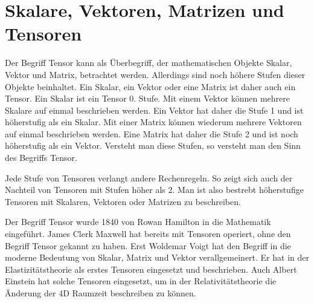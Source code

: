 \section{Skalare, Vektoren, Matrizen und Tensoren\label{spannung:section:Skalare,_Vektoren,_Matrizen_und_Tensoren}}
Der Begriff Tensor kann als Überbegriff, der mathematischen Objekte Skalar, Vektor und Matrix, betrachtet werden.
Allerdings sind noch höhere Stufen dieser Objekte beinhaltet.
Ein Skalar, ein Vektor oder eine Matrix ist daher auch ein Tensor.
Ein Skalar ist ein Tensor 0. Stufe.
Mit einem Vektor können mehrere Skalare auf einmal beschrieben werden.
Ein Vektor hat daher die Stufe 1 und ist höherstufig als ein Skalar.
Mit einer Matrix können wiederum mehrere Vektoren auf einmal beschrieben werden.
Eine Matrix hat daher die Stufe 2 und ist noch höherstufig als ein Vektor.
Versteht man diese Stufen, so versteht man den Sinn des Begriffs Tensor.

Jede Stufe von Tensoren verlangt andere Rechenregeln.
So zeigt sich auch der Nachteil von Tensoren mit Stufen höher als 2.
Man ist also bestrebt höherstufige Tensoren mit Skalaren, Vektoren oder Matrizen zu beschreiben.

Der Begriff Tensor wurde 1840 von Rowan Hamilton in die Mathematik eingeführt.
James Clerk Maxwell hat bereits mit Tensoren operiert, ohne den Begriff Tensor gekannt zu haben.
Erst Woldemar Voigt hat den Begriff in die moderne Bedeutung von Skalar, Matrix und Vektor verallgemeinert.
Er hat in der Elastizitätstheorie als erstes Tensoren eingesetzt und beschrieben.
Auch Albert Einstein hat solche Tensoren eingesetzt,
um in der Relativitätstheorie die Änderung der 4D Raumzeit beschreiben zu können.
\cite{spannung:Tensor}
\cite{spannung:Voigtsche-Notation}
